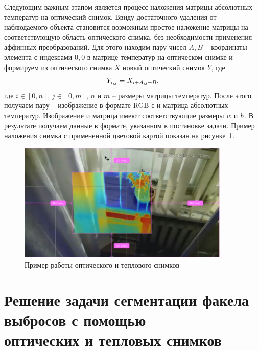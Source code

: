 \documentclass[14pt, a4paper]{extreport}
\begin{document}
	Следующим важным этапом является процесс наложения матрицы абсолютных температур на оптический снимок. Ввиду достаточного удаления от наблюдаемого объекта становится возможным простое наложение матрицы на соответствующую область оптического снимка, без необходимости применения аффинных преобразований. 
	Для этого находим пару чисел $A, B$ -- координаты элемента с индексами $0, 0$ в матрице температур на оптическом снимке и формируем из оптического снимка $X$ новый оптический снимок $Y$, где
	\vspace*{-0.3cm}
	\begin{equation*}
		Y_{i,j} = X_{i + A,j + B},
		\label{eq:nalozhenie}
		\vspace*{-0.3cm}
	\end{equation*}
	где $i \in [0, n]$, $j \in [0, m]$, $n$ и $m$ -- размеры матрицы температур. После этого получаем пару -- изображение в формате RGB с и матрица абсолютных температур. Изображение и матрица имеют соответствующие размеры $w$ и $h$. В результате получаем данные в формате, указанном в постановке задачи. Пример наложения снимка с примененной цветовой картой показан на рисунке~\ref{fig:nalozhenie_examp}.
	\begin{figure}[h!]
		\centering
		\includegraphics[width = 0.9\textwidth]{image/chapter_2/nalozhenie_examp}	
		\caption{Пример работы оптического и теплового снимков}
		\label{fig:nalozhenie_examp}
	\end{figure}
	\section[\vspace*{-0.22cm}Решение задачи сегментации факела выбросов с помощью \\ \hspace*{-0.75cm}оптических и тепловых снимков]{\vspace*{-0.22cm}Решение задачи сегментации факела выбросов с помощью \\ \hspace*{-2.05cm}оптических и тепловых снимков}
\end{document}
